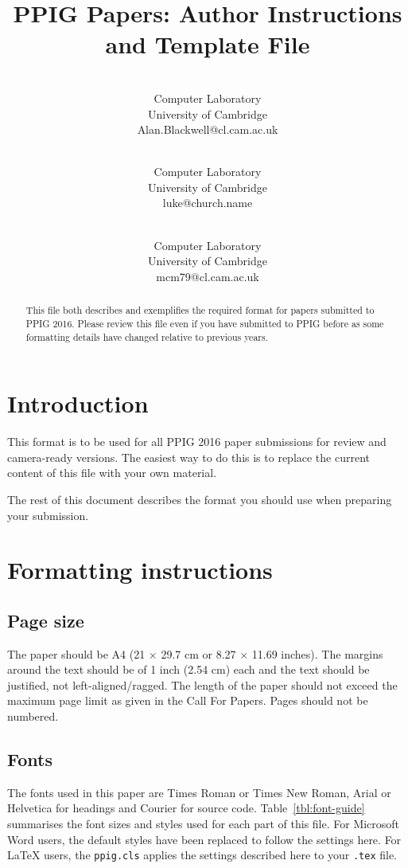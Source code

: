 \documentclass{ppig}
\title{PPIG Papers: Author Instructions and Template File}
\author{\authorname{Alan F. Blackwell} \\
    Computer Laboratory \\
    University of Cambridge \\
    Alan.Blackwell@cl.cam.ac.uk \\
    \and
    \authorname{Luke Church} \\
    Computer Laboratory \\
    University of Cambridge \\
    luke@church.name \\
    \and
    \authorname{Mariana M\unichar{259}r\unichar{259}\unichar{537}oiu} \\
    Computer Laboratory \\
    University of Cambridge \\
    mcm79@cl.cam.ac.uk}
\date{}
\begin{document}
\maketitle
\thispagestyle{ppigstyle}

\begin{abstract}
This file both describes and exemplifies the required format for papers submitted to PPIG 2016. Please review this file even if you have submitted to PPIG before as some formatting details have changed relative to previous years.
\end{abstract}

\section{Introduction}

This format is to be used for all PPIG 2016 paper submissions for review and camera-ready versions. The easiest way to do this is to replace the current content of this file with your own material.

The rest of this document describes the format you should use when preparing your submission.

\section{Formatting instructions}

\subsection{Page size}

The paper should be A4 (21 $\times$ 29.7 cm or 8.27 $\times$ 11.69 inches). The margins around the text should be of 1 inch (2.54 cm) each and the text should be justified, not left-aligned/ragged. The length of the paper should not exceed the maximum page limit as given in the Call For Papers. Pages should not be numbered.

\subsection{Fonts}

The fonts used in this paper are Times Roman or Times New Roman, Arial or Helvetica for headings and Courier for source code. Table~\ref{tbl:font-guide} summarises the font sizes and styles used for each part of this file. For Microsoft Word users, the default styles have been replaced to follow the settings here. For \LaTeX{} users, the \texttt{ppig.cls} applies the settings described here to your \texttt{.tex} file.
\end{document}
